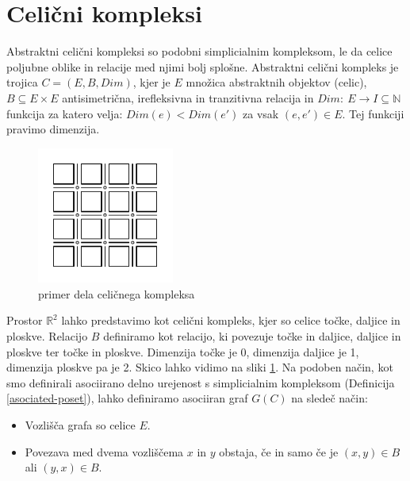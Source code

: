 \documentclass[a4paper, 12pt]{book}
\theoremstyle{definition}
\theoremstyle{remark}
\begin{document}
\section{Celični kompleksi} \label{celicni-kompleksi}
Abstraktni celični kompleksi so podobni simplicialnim kompleksom, le da
celice poljubne oblike in relacije med njimi bolj splošne. Abstraktni celični kompleks
je trojica $C = (E,B,Dim)$, kjer je $E$ množica abstraktnih objektov (celic), $B \subseteq E \times E$ antisimetrična,
irefleksivna in tranzitivna relacija in $Dim:\ E \rightarrow I\subseteq\mathbb{N}$ funkcija
za katero velja: $Dim(e) < Dim(e')$ za vsak $(e,e') \in E$. Tej funkciji pravimo
dimenzija.
\begin{figure}[h]
  \begin{center}
  \includegraphics[width=0.4\textwidth]{r2-cell.pdf}
  \end{center}
  \caption{primer dela celičnega kompleksa}
  \label{celicni}
\end{figure}
Prostor $\mathbb{R}^2$ lahko predstavimo kot celični kompleks, kjer so celice
točke, daljice in ploskve. Relacijo $B$ definiramo kot relacijo, ki povezuje
točke in daljice, daljice in ploskve ter točke in ploskve. Dimenzija točke je 0,
dimenzija daljice je 1, dimenzija ploskve pa je 2. Skico lahko vidimo na sliki
\ref{celicni}.
Na podoben način, kot smo definirali asociirano delno urejenost s simplicialnim
kompleksom (Definicija \ref{asociated-poset}), lahko definiramo asociiran graf
$G(C)$ na sledeč način:
\begin{itemize}
  \item Vozlišča grafa so celice $E$.
  \item Povezava med dvema vozliščema $x$ in $y$ obstaja, če in samo če je
  $(x,y) \in B$ ali $(y,x) \in B$.
\end{itemize}
\end{document}
